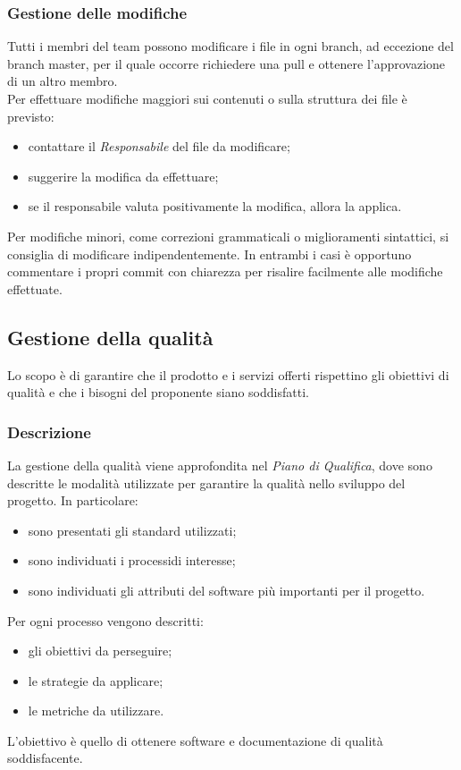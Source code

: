 \subsubsection{Gestione delle modifiche}
Tutti i membri del team possono modificare i file in ogni branch, ad eccezione del branch master, per il quale occorre richiedere una pull e ottenere l'approvazione di un altro membro. \\
Per effettuare modifiche maggiori sui contenuti o sulla struttura dei file è previsto: \begin{itemize}
\item contattare il \textit{Responsabile} del file da modificare;
\item suggerire la modifica da effettuare;
\item se il responsabile valuta positivamente la modifica, allora la applica.
\end{itemize}
Per modifiche minori, come correzioni grammaticali o miglioramenti sintattici, si consiglia di modificare indipendentemente. In entrambi i casi è opportuno commentare i propri commit con chiarezza per risalire facilmente alle modifiche effettuate.

\subsection{Gestione della qualità}
Lo scopo è di garantire che il prodotto e i servizi offerti rispettino gli obiettivi di qualità e che i bisogni del proponente siano soddisfatti. 

\subsubsection{Descrizione}
La gestione della qualità viene approfondita nel \textit{Piano di Qualifica}, dove sono descritte le modalità utilizzate per garantire la qualità nello sviluppo del progetto. In particolare: \begin{itemize}
\item sono presentati gli standard utilizzati;
\item sono individuati i processi\glo di interesse;
\item sono individuati gli attributi del software più importanti per il progetto.
\end{itemize}
Per ogni processo vengono descritti: \begin{itemize}
\item gli obiettivi da perseguire;
\item le strategie da applicare;
\item le metriche da utilizzare.
\end{itemize}
L'obiettivo è quello di ottenere software e documentazione di qualità soddisfacente.

